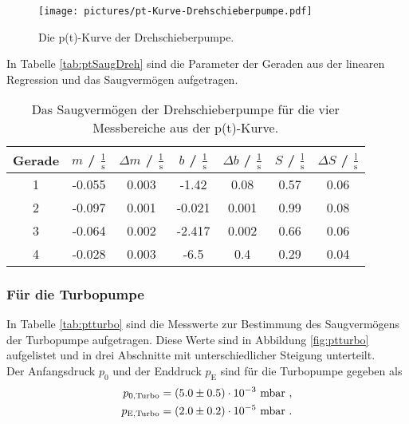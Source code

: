 \begin{figure}[H] %
  \centering
  \texttt{[image: pictures/pt-Kurve-Drehschieberpumpe.pdf]}
  \caption{Die p(t)-Kurve der Drehschieberpumpe.}
  \label{fig:ptdreh}
\end{figure}

In Tabelle \eqref{tab:ptSaugDreh} sind die Parameter der Geraden aus der linearen Regression und das Saugvermögen aufgetragen.

\begin{table}[H]
  \centering
  \caption{Das Saugvermögen der Drehschieberpumpe für die vier Messbereiche aus der p(t)-Kurve.}
  \label{tab:ptSaugDreh}
    \begin{tabular}{c|c|c|c|c|c|c}
      Gerade & $m$ / $\frac{1}{\text{s}}$ & $\Delta m$ / $\frac{1}{\text{s}}$ & $b$ / $\frac{1}{\text{s}}$ & $\Delta b$ / $\frac{1}{\text{s}}$ & $S$ / $\frac{\text{l}}{\text{s}}$ & $\Delta S$ / $\frac{\text{l}}{\text{s}}$ \\
      \midrule
      1 & -0.055 & 0.003 & -1.42  & 0.08  & 0.57 & 0.06 \\
      2 & -0.097 & 0.001 & -0.021 & 0.001 & 0.99 & 0.08 \\
      3 & -0.064 & 0.002 & -2.417 & 0.002 & 0.66 & 0.06 \\
      4 & -0.028 & 0.003 & -6.5   & 0.4   & 0.29 & 0.04 \\
    \end{tabular}
\end{table}



\subsubsection{Für die Turbopumpe}
In Tabelle \eqref{tab:ptturbo} sind die Messwerte zur Bestimmung des Saugvermögens der Turbopumpe aufgetragen. Diese Werte sind in Abbildung \eqref{fig:ptturbo} aufgelistet und in drei Abschnitte mit unterschiedlicher Steigung unterteilt. \\
Der Anfangsdruck $p_0$ und der Enddruck $p_\text{E}$ sind für die Turbopumpe gegeben als
\begin{align*}
  p_{0,\text{Turbo}} = (\num{5 +- 0.5})\cdot 10^{-3}\ \text{mbar} \ , \\
  p_{\text{E},\text{Turbo}} = (\num{2 +- 0.2})\cdot 10^{-5}\ \text{mbar} \ .
\end{align*}

